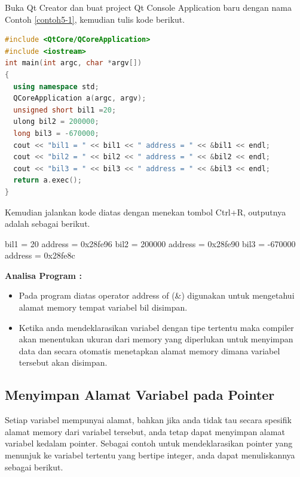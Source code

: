 Buka Qt Creator dan buat project Qt Console Application baru dengan nama
Contoh \ref{contoh5-1}, kemudian tulis kode berikut.

\begin{lstlisting}[language=c++, caption=Menampilkan alamat memory menggunakan address-of operator, label=contoh5-1]
#include <QtCore/QCoreApplication>
#include <iostream>
int main(int argc, char *argv[])
{
  using namespace std;
  QCoreApplication a(argc, argv);
  unsigned short bil1 =20;
  ulong bil2 = 200000;
  long bil3 = -670000;
  cout << "bil1 = " << bil1 << " address = " << &bil1 << endl;
  cout << "bil2 = " << bil2 << " address = " << &bil2 << endl;
  cout << "bil3 = " << bil3 << " address = " << &bil3 << endl;
  return a.exec();
}
\end{lstlisting}

Kemudian jalankan kode diatas dengan menekan tombol Ctrl+R, outputnya
adalah sebagai berikut.

\begin{lcverbatim}
bil1 = 20 address = 0x28fe96 
bil2 = 200000 address = 0x28fe90 
bil3 = -670000 address = 0x28fe8c
\end{lcverbatim}

\textbf{Analisa Program :}

\begin{itemize}

\item
  Pada program diatas operator address of (\&) digunakan untuk
  mengetahui alamat memory tempat variabel bil disimpan.
\item
  Ketika anda mendeklarasikan variabel dengan tipe tertentu maka
  compiler akan menentukan ukuran dari memory yang diperlukan untuk
  menyimpan data dan secara otomatis menetapkan alamat memory dimana
  variabel tersebut akan disimpan.
\end{itemize}

\subsection{Menyimpan Alamat Variabel pada
Pointer}\label{menyimpan-alamat-variabel-pada-pointer}

Setiap variabel mempunyai alamat, bahkan jika anda tidak tau secara
spesifik alamat memory dari variabel tersebut, anda tetap dapat
menyimpan alamat variabel kedalam pointer. Sebagai contoh untuk
mendeklarasikan pointer yang menunjuk ke variabel tertentu yang bertipe
integer, anda dapat menuliskannya sebagai berikut.

